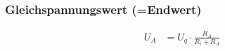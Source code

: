\subsubsection{Gleichspannungswert (=Endwert)}
\begin{align*}
    U_A & = U_q\cdot\frac{R_A}{R_i+R_A}
\end{align*}







